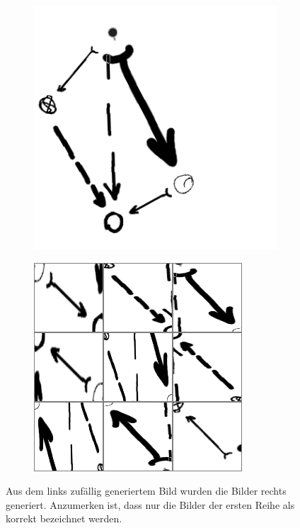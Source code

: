 \begin{figure}
  \centering
    \begin{subfigure}[b]{0.3\textwidth}
        \includegraphics[width=\textwidth]{images/pre_crop.png}
        \caption{}
        \label{fig:pre_crop}
    \end{subfigure}
    \begin{subfigure}[b]{0.3\textwidth}
      \includegraphics[width=\textwidth]{images/crops.png}
      \caption{}
      \label{fig:crop}
    \end{subfigure}
    \caption{Aus dem links zufällig generiertem Bild wurden die Bilder rechts generiert. Anzumerken ist, dass nur die Bilder der ersten Reihe als korrekt bezeichnet werden.}
    \label{fig:constraint_data}
\end{figure}

